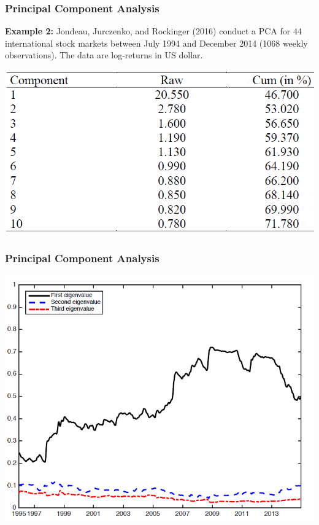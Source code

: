 \documentclass[xcolor=dvipsnames, english, 8pt]{beamer}
\begin{document}
\begin{frame}
    \frametitle{Principal Component Analysis}
\textbf{Example 2:} Jondeau, Jurczenko, and Rockinger (2016) conduct a PCA for 44 international stock markets between July 1994 and December 2014 (1068 weekly observations). The data are log-returns in US dollar.\vspace{0.25cm}\\
\begin{center}
    \includegraphics[scale=0.4]{PCA1}
\end{center}
\end{frame}

\begin{frame}
    \frametitle{Principal Component Analysis}

\begin{center}
    \includegraphics[scale=0.4]{PCA2}
\end{center}
\end{frame}
\end{document}
